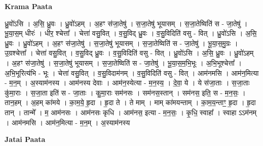 \documentclass[17pt]{extarticle}
\begin{document}
\textbf{Krama Paata} \newline

ध्रु॒वो॑ऽसि । अ॒सि॒ ध्रु॒वः । ध्रु॒वो॑ऽहम् । अ॒हꣳ स॑जा॒तेषु॑ । स॒जा॒तेषु॑ भूयासम् । स॒जा॒तेष्विति॑ स - जा॒तेषु॑ । भू॒या॒स॒म् धीरः॑ । धीर॒ श्चेत्ता᳚ । चेत्ता॑ वसु॒वित् । व॒सु॒विद् ध्रु॒वः । व॒सु॒विदिति॑ वसु - वित् । ध्रु॒वो॑ऽसि । अ॒सि॒ ध्रु॒वः । ध्रु॒वो॑ऽहम् । अ॒हꣳ स॑जा॒तेषु॑ । स॒जा॒तेषु॑ भूयासम् । स॒जा॒तेष्विति॑ स - जा॒तेषु॑ । भू॒या॒स॒मु॒ग्रः । उ॒ग्रश्चेत्ता᳚ । चेत्ता॑ वसु॒वित् । व॒सु॒विद् ध्रु॒वः । व॒सु॒विदिति॑ वसु - वित् । ध्रु॒वो॑ऽसि । अ॒सि॒ ध्रु॒वः । ध्रु॒वो॑ऽहम् । अ॒हꣳ स॑जा॒तेषु॑ । स॒जा॒तेषु॑ भूयासम् । स॒जा॒तेष्विति॑ स - जा॒तेषु॑ । भू॒या॒स॒म॒भि॒भूः । अ॒भि॒भूश्चेत्ता᳚ । अ॒भि॒भूरित्य॑भि - भूः । चेत्ता॑ वसु॒वित् । व॒सु॒विदाम॑नम् । व॒सु॒विदिति॑ वसु - वित् । आम॑नमसि । आम॑न॒मित्या - म॒न॒म् । अ॒स्याम॑नस्य । आम॑नस्य देवाः । आम॑न॒स्येत्या - म॒न॒स्य॒ । दे॒वा॒ ये । ये स॑जा॒ताः । स॒जा॒ताः कु॑मा॒राः । स॒जा॒ता इति॑ स - जा॒ताः । कु॒मा॒राः सम॑नसः । सम॑नस॒स्तान् । सम॑नस॒ इति॒ स - म॒न॒सः॒ । तान॒हम् । अ॒हम् का॑मये । का॒म॒ये॒ हृ॒दा । हृ॒दा ते । ते माम् । माम् का॑मयन्ताम् । का॒म॒य॒न्ताꣳ॒॒ हृ॒दा । हृ॒दा तान् । तान्मे᳚ । म॒ आम॑नसः । आम॑नसः कृधि । आम॑नस॒ इत्या - म॒न॒सः॒ । कृ॒धि॒ स्वाहा᳚ । स्वाहा ऽऽम॑नम् । आम॑नमसि । आम॑न॒मित्या - म॒न॒म् । अ॒स्याम॑नस्य \newline

\textbf{Jatai Paata} \newline
\end{document}
